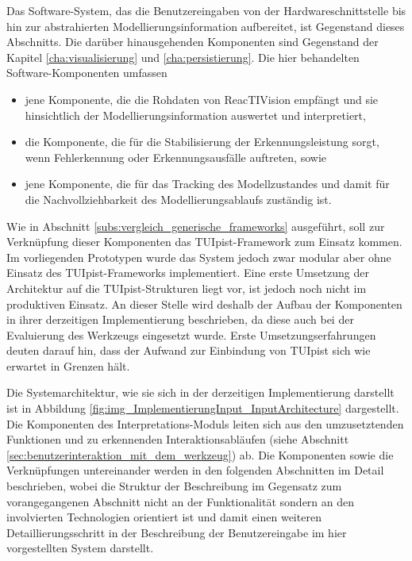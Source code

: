 Das Software-System, das die Benutzereingaben von der Hardwareschnittstelle bis hin zur abstrahierten Modellierungsinformation aufbereitet, ist Gegenstand dieses Abschnitts. Die darüber hinausgehenden Komponenten sind Gegenstand der Kapitel \ref{cha:visualisierung} und \ref{cha:persistierung}. Die hier behandelten Software-Komponenten umfassen
\begin{itemize}
	\item jene Komponente, die die Rohdaten von ReacTIVision empfängt und sie hinsichtlich der Modellierungsinformation auswertet und interpretiert,
	\item die Komponente, die für die Stabilisierung der Erkennungsleistung sorgt, wenn Fehlerkennung oder Erkennungsausfälle auftreten, sowie
	\item jene Komponente, die für das Tracking des Modellzustandes und damit für die Nachvollziehbarkeit des Modellierungsablaufs zuständig ist. 
\end{itemize}
Wie in Abschnitt \ref{subs:vergleich_generische_frameworks} ausgeführt, soll zur Verknüpfung dieser Komponenten das TUIpist-Framework zum Einsatz kommen. Im vorliegenden Prototypen wurde das System jedoch zwar modular aber ohne Einsatz des TUIpist-Frameworks implementiert. Eine erste Umsetzung der Architektur auf die TUIpist-Strukturen liegt vor, ist jedoch noch nicht im produktiven Einsatz. An dieser Stelle wird deshalb der Aufbau der Komponenten in ihrer derzeitigen Implementierung beschrieben, da diese auch bei der Evaluierung des Werkzeugs eingesetzt wurde. Erste Umsetzungserfahrungen deuten darauf hin, dass der Aufwand zur Einbindung von TUIpist sich wie erwartet in Grenzen hält.

Die Systemarchitektur, wie sie sich in der derzeitigen Implementierung darstellt ist in Abbildung \ref{fig:img_ImplementierungInput_InputArchitecture} dargestellt. Die Komponenten des Interpretations-Moduls leiten sich aus den umzusetztenden Funktionen und zu erkennenden Interaktionsabläufen (siehe Abschnitt \ref{sec:benutzerinteraktion_mit_dem_werkzeug}) ab. Die Komponenten sowie die Verknüpfungen untereinander werden in den folgenden Abschnitten im Detail beschrieben, wobei die Struktur der Beschreibung im Gegensatz zum vorangegangenen Abschnitt nicht an der Funktionalität sondern an den involvierten Technologien orientiert ist und damit einen weiteren Detaillierungsschritt in der Beschreibung der Benutzereingabe im hier vorgestellten System darstellt.

